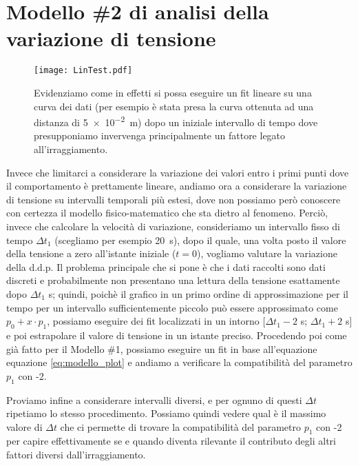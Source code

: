 \documentclass[
    rmp,
    reprint, 
    superscriptaddress, 
    altaffilletter, 
    amsmath, 
    amssymb,
    a4paper]{revtex4-2}
\begin{document}
\section*{Modello \#2 di analisi della variazione di tensione}

\begin{figure}
    \texttt{[image: LinTest.pdf]}
    \caption{Evidenziamo come in effetti si possa eseguire un fit lineare su una curva dei dati (per esempio è stata presa la curva ottenuta ad una distanza di \SI{5e-2}{\metre}) dopo un iniziale intervallo di tempo dove presupponiamo invervenga principalmente un fattore legato all'irraggiamento. }
    \label{fig:plot:linear}
\end{figure}

Invece che limitarci a considerare la variazione dei valori entro i primi punti dove il comportamento è prettamente lineare, andiamo ora a considerare la variazione di tensione su intervalli temporali più estesi, dove non possiamo però conoscere con certezza il modello fisico-matematico che sta dietro al fenomeno. Perciò, invece che calcolare la velocità di variazione, consideriamo un intervallo fisso di tempo $\Delta t_1$ (scegliamo per esempio \SI{20}{\second}), dopo il quale, una volta posto il valore della tensione a zero all'istante iniziale ($t=0$), vogliamo valutare la variazione della d.d.p. Il problema principale che si pone è che i dati raccolti sono dati discreti e probabilmente non presentano una lettura della tensione esattamente dopo $\Delta t_1$ s; quindi, poichè il grafico in un primo ordine di approssimazione per il tempo per un intervallo sufficientemente piccolo può essere approssimato come $p_0+x\cdot p_1$, possiamo eseguire dei fit localizzati in un intorno [$\Delta t_1-2$ s; $\Delta t_1+2$ s] e poi estrapolare il valore di tensione in un istante preciso. Procedendo poi come già fatto per il Modello \#1, possiamo eseguire un fit in base all'equazione equazione \ref{eq:modello_plot} e andiamo a verificare la compatibilità del parametro $p_1$ con -2.

Proviamo infine a considerare intervalli diversi, e per ognuno di questi $\Delta t$ ripetiamo lo stesso procedimento. Possiamo quindi vedere qual è il massimo valore di $\Delta t $ che ci permette di trovare la compatibilità del parametro $p_1$ con -2 per capire effettivamente se e quando diventa rilevante il contributo degli altri fattori diversi dall'irraggiamento.
\end{document}
